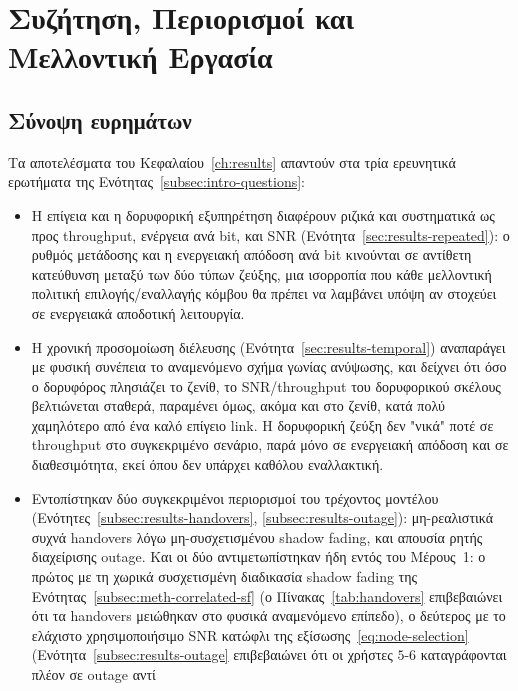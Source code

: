 \chapter{Συζήτηση, Περιορισμοί και Μελλοντική Εργασία}
\label{ch:discussion}

\section{Σύνοψη ευρημάτων}
\label{sec:disc-summary}

Τα αποτελέσματα του Κεφαλαίου~\ref{ch:results} απαντούν στα τρία
ερευνητικά ερωτήματα της Ενότητας~\ref{subsec:intro-questions}:

\begin{itemize}
  \item[\textbf{Ε1.}] Η επίγεια και η δορυφορική εξυπηρέτηση διαφέρουν
    ριζικά και συστηματικά ως προς throughput, ενέργεια ανά bit, και SNR
    (Ενότητα~\ref{sec:results-repeated}): ο ρυθμός μετάδοσης και η
    ενεργειακή απόδοση ανά bit κινούνται σε αντίθετη κατεύθυνση μεταξύ των
    δύο τύπων ζεύξης, μια ισορροπία που κάθε μελλοντική πολιτική
    επιλογής/εναλλαγής κόμβου θα πρέπει να λαμβάνει υπόψη αν στοχεύει σε
    ενεργειακά αποδοτική λειτουργία.
  \item[\textbf{Ε2.}] Η χρονική προσομοίωση διέλευσης
    (Ενότητα~\ref{sec:results-temporal}) αναπαράγει με φυσική συνέπεια το
    αναμενόμενο σχήμα γωνίας ανύψωσης, και δείχνει ότι όσο ο δορυφόρος
    πλησιάζει το ζενίθ, το SNR/throughput του δορυφορικού σκέλους
    βελτιώνεται σταθερά, παραμένει όμως, ακόμα και στο ζενίθ, κατά πολύ
    χαμηλότερο από ένα καλό επίγειο link. Η δορυφορική ζεύξη δεν
    "νικά" ποτέ σε throughput στο συγκεκριμένο σενάριο, παρά μόνο σε
    ενεργειακή απόδοση και σε διαθεσιμότητα, εκεί όπου δεν υπάρχει καθόλου
    εναλλακτική.
  \item[\textbf{Ε3.}] Εντοπίστηκαν δύο συγκεκριμένοι περιορισμοί του
    τρέχοντος μοντέλου (Ενότητες~\ref{subsec:results-handovers},
    \ref{subsec:results-outage}): μη-ρεαλιστικά συχνά handovers λόγω
    μη-συσχετισμένου shadow fading, και απουσία ρητής διαχείρισης outage.
    Και οι δύο αντιμετωπίστηκαν ήδη εντός του Μέρους~1: ο πρώτος με τη
    χωρικά συσχετισμένη διαδικασία shadow fading της
    Ενότητας~\ref{subsec:meth-correlated-sf} (ο Πίνακας~\ref{tab:handovers}
    επιβεβαιώνει ότι τα handovers μειώθηκαν στο φυσικά αναμενόμενο επίπεδο),
    ο δεύτερος με το ελάχιστο χρησιμοποιήσιμο SNR κατώφλι της
    εξίσωσης~\eqref{eq:node-selection} (Ενότητα~\ref{subsec:results-outage}
    επιβεβαιώνει ότι οι χρήστες $5$-$6$ καταγράφονται πλέον σε outage αντί

\end{itemize}

